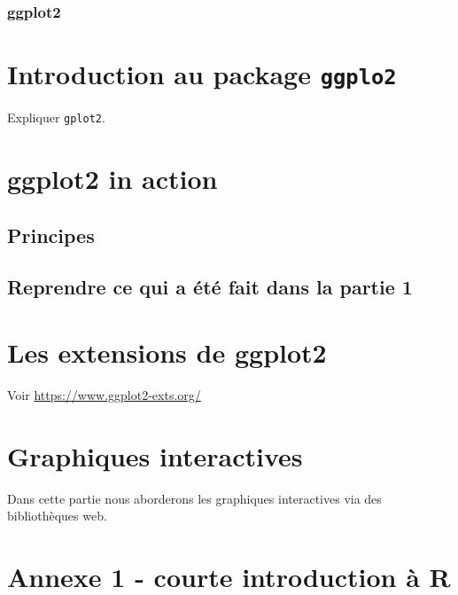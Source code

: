 \documentclass[]{article}
\begin{document}
\hypertarget{ggplot2}{%
\subsubsection{ggplot2}\label{ggplot2}}

\hypertarget{introduction-au-package-ggplo2}{%
\section{\texorpdfstring{Introduction au package \texttt{ggplo2}}{Introduction au package ggplo2}}\label{introduction-au-package-ggplo2}}

Expliquer \texttt{gplot2}.

\hypertarget{ggplot2-in-action}{%
\section{ggplot2 in action}\label{ggplot2-in-action}}

\hypertarget{principes-1}{%
\subsection{Principes}\label{principes-1}}

\hypertarget{reprendre-ce-qui-a-uxe9tuxe9-fait-dans-la-partie-1}{%
\subsection{Reprendre ce qui a été fait dans la partie 1}\label{reprendre-ce-qui-a-uxe9tuxe9-fait-dans-la-partie-1}}

\hypertarget{les-extensions-de-ggplot2}{%
\section{Les extensions de ggplot2}\label{les-extensions-de-ggplot2}}

Voir \url{https://www.ggplot2-exts.org/}

\hypertarget{graphiques-interactives}{%
\section{Graphiques interactives}\label{graphiques-interactives}}

Dans cette partie nous aborderons les graphiques interactives via des bibliothèques web.

\hypertarget{annexe-1---courte-introduction-uxe0-r}{%
\section*{Annexe 1 - courte introduction à R}\label{annexe-1---courte-introduction-uxe0-r}}
\end{document}
